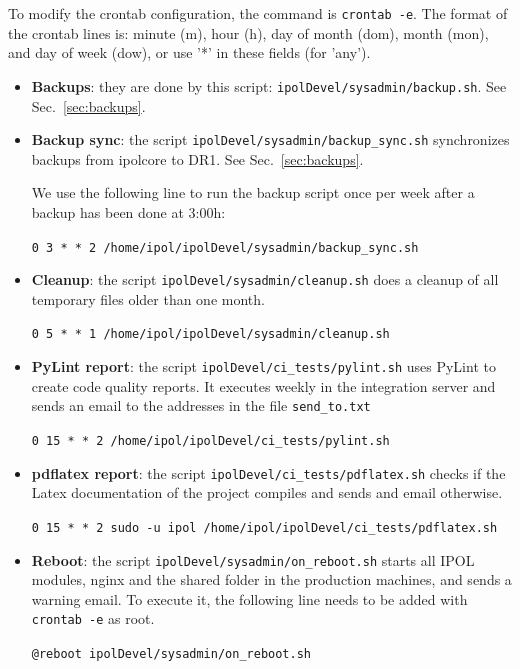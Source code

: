 \documentclass[a4paper,12pt]{article}
\begin{document}
To modify the crontab configuration, the command is {\tt crontab -e}. The format of the crontab lines is: minute (m), hour (h), day of month (dom), month (mon), and day of week (dow), or use '*' in these fields (for 'any').

\begin{itemize}
    \item \textbf{Backups}: they are done by this script: {\tt ipolDevel/sysadmin/backup.sh}. See Sec.~\ref{sec:backups}.
    
    \item \textbf{Backup sync}: the script {\tt ipolDevel/sysadmin/backup\_sync.sh} synchronizes backups from ipolcore to DR1. See Sec.~\ref{sec:backups}.

We use the following line to run the backup script once per week after a backup has been done at 3:00h:

    {\tt 0 3 * * 2 /home/ipol/ipolDevel/sysadmin/backup\_sync.sh}
    
    \item \textbf{Cleanup}: the script {\tt ipolDevel/sysadmin/cleanup.sh} does a cleanup of all temporary files older than one month.

    {\tt 0 5 * * 1 /home/ipol/ipolDevel/sysadmin/cleanup.sh}

    \item \textbf{PyLint report}: the script {\tt ipolDevel/ci\_tests/pylint.sh} uses PyLint to create code quality reports. It executes weekly in the integration server and sends an email to the addresses in the file {\tt send\_to.txt}

    {\tt 0 15 * * 2 /home/ipol/ipolDevel/ci\_tests/pylint.sh}

    \item \textbf{pdflatex report}: the script {\tt ipolDevel/ci\_tests/pdflatex.sh} checks if the Latex documentation of the project compiles and sends and email otherwise.

    {\tt 0 15 * * 2 sudo -u ipol /home/ipol/ipolDevel/ci\_tests/pdflatex.sh}

    \item \textbf{Reboot}: the script {\tt ipolDevel/sysadmin/on\_reboot.sh} starts all IPOL modules, nginx and the shared folder in the production machines, and sends a warning email. To execute it, the following line needs to be added with {\tt crontab -e} as root.

    {\tt @reboot ipolDevel/sysadmin/on\_reboot.sh}
\end{itemize}
\end{document}
